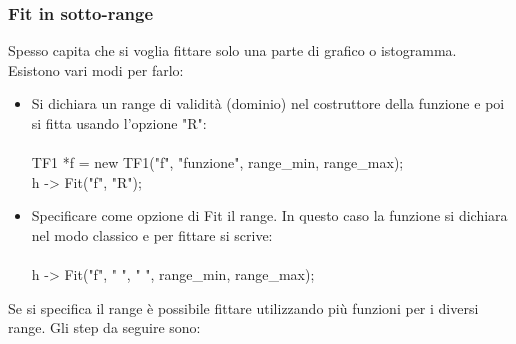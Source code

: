 \documentclass[10pt,a4paper]{article}
\begin{document}
  \subsubsection*{Fit in sotto-range}
 Spesso capita che si voglia fittare solo una parte di grafico o istogramma. Esistono vari modi per farlo:
 \begin{itemize}
 	\item Si dichiara un range di validità (dominio) nel costruttore della funzione e poi si fitta usando l'opzione "R":\\\\
 	TF1 *f = new TF1("f", "funzione", range\_min, range\_max);\\
 	h -> Fit("f", "R");\\
 	\item Specificare come opzione di Fit il range. In questo caso la funzione si dichiara nel modo classico e per fittare si scrive:\\\\
 	h -> Fit("f", " ", " ", range\_min, range\_max); 	
 \end{itemize}
Se si specifica il range è possibile fittare utilizzando più funzioni per i diversi range. Gli step da seguire sono:
\end{document}
